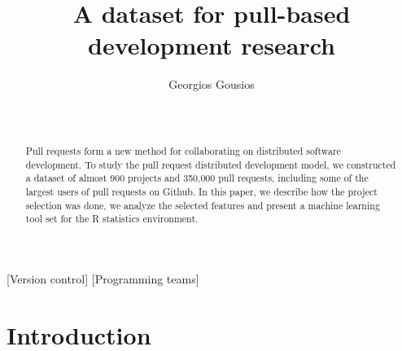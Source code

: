 \documentclass{sig-alternate}
\begin{document}
\newcommand{\todo}[1]{\textbf{TODO}\footnote{\textbf{TODO:} #1}}

\newcommand{\ghtorrent}{ \textsc{ght}orrent\xspace}
\newcommand{\api}{\textsc{api}\xspace}
\newcommand{\pullreqs}{ \textsf{pullreqs}\xspace}

\title{A dataset for pull-based development research}

\author{
\alignauthor
Georgios Gousios\\
       \\
       \\
}

\maketitle

\begin{abstract}

Pull requests form a new method for collaborating on distributed software
development. To study the pull request distributed development model, we
constructed a dataset of almost 900 projects and 350,000 pull requests, 
including some of the largest
users of pull requests on Github. In this paper, we describe how the project
selection was done, we analyze the selected features and present a machine
learning tool set for the R statistics environment. 

\end{abstract}

[Version control]
[Programming teams]



\section{Introduction}
\label{sec:intro}
\end{document}
